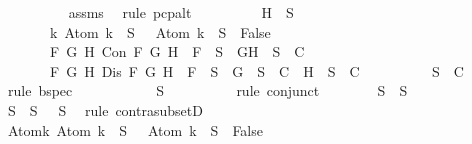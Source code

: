 \begin{isabellebody}
\ \ \ \ \ \ \ \ \isamarkupfalse%
\ assms\ \isamarkupfalse%
\ {\isacharparenleft}rule\ pcp{\isacharunderscore}alt{}{\isacharparenright}\isanewline
\ \ \ \ \ \ \isamarkupfalse%
\ \isamarkupfalse%
\ H{\isacharcolon}{\isachardoublequoteopen}{\isasymbottom}\ {\isasymnotin}\ S\isanewline
\ \ \ \ \ \ {\isasymand}\ {\isacharparenleft}{\isasymforall}k{\isachardot}\ Atom\ k\ {\isasymin}\ S\ {\isasymlongrightarrow}\ \isactrlbold {\isasymnot}\ {\isacharparenleft}Atom\ k{\isacharparenright}\ {\isasymin}\ S\ {\isasymlongrightarrow}\ False{\isacharparenright}\isanewline
\ \ \ \ \ \ {\isasymand}\ {\isacharparenleft}{\isasymforall}F\ G\ H{\isachardot}\ Con\ F\ G\ H\ {\isasymlongrightarrow}\ F\ {\isasymin}\ S\ {\isasymlongrightarrow}\ {\isacharbraceleft}G{\isacharcomma}H{\isacharbraceright}\ {\isasymunion}\ S\ {\isasymin}\ C{\isacharparenright}\isanewline
\ \ \ \ \ \ {\isasymand}\ {\isacharparenleft}{\isasymforall}F\ G\ H{\isachardot}\ Dis\ F\ G\ H\ {\isasymlongrightarrow}\ F\ {\isasymin}\ S\ {\isasymlongrightarrow}\ {\isacharbraceleft}G{\isacharbraceright}\ {\isasymunion}\ S\ {\isasymin}\ C\ {\isasymor}\ {\isacharbraceleft}H{\isacharbraceright}\ {\isasymunion}\ S\ {\isasymin}\ C{\isacharparenright}{\isachardoublequoteclose}\isanewline
\ \ \ \ \ \ \ \ \isamarkupfalse%
\ {\isacartoucheopen}S\ {\isasymin}\ C{\isacartoucheclose}\ \isamarkupfalse%
\ {\isacharparenleft}rule\ bspec{\isacharparenright}\isanewline
\ \ \ \ \ \ \isamarkupfalse%
\ \isamarkupfalse%
\ {\isachardoublequoteopen}{\isasymbottom}\ {\isasymnotin}\ S{\isachardoublequoteclose}\isanewline
\ \ \ \ \ \ \ \ \isamarkupfalse%
\ {\isacharparenleft}rule\ conjunct{}{\isacharparenright}\isanewline
\ \ \ \ \ \ \isamarkupfalse%
\ S{}{\isacharcolon}{\isachardoublequoteopen}{\isasymbottom}\ {\isasymnotin}\ S{\isacharprime}{\isachardoublequoteclose}\isanewline
\ \ \ \ \ \ \ \ \isamarkupfalse%
\ {\isacartoucheopen}S{\isacharprime}\ {\isasymsubseteq}\ S{\isacartoucheclose}\ {\isacartoucheopen}{\isasymbottom}\ {\isasymnotin}\ S{\isacartoucheclose}\ \isamarkupfalse%
\ {\isacharparenleft}rule\ contra{\isacharunderscore}subsetD{\isacharparenright}\isanewline
\ \ \ \ \ \ \isamarkupfalse%
\ Atom{\isacharcolon}{\isachardoublequoteopen}{\isasymforall}k{\isachardot}\ Atom\ k\ {\isasymin}\ S\ {\isasymlongrightarrow}\ \isactrlbold {\isasymnot}\ {\isacharparenleft}Atom\ k{\isacharparenright}\ {\isasymin}\ S\ {\isasymlongrightarrow}\ False{\isachardoublequoteclose}\isanewline

\end{isabellebody}
